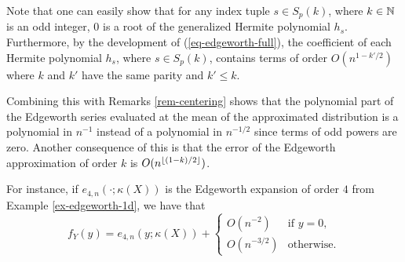 \begin{remark} \label{rem-edge-mean}
    Note that one can easily show that for any index tuple $s \in S_p(k)$, where $k \in \mathbb{N}$ is an odd integer, 0 is a root of the generalized Hermite polynomial $h_s$. 
    Furthermore, by the development of (\ref{eq-edgeworth-full}), the coefficient of each Hermite polynomial $h_s$, where $s \in S_p(k)$, contains terms of order $O(n^{1-k'/2})$ where $k$ and $k'$ have the same parity and $k' \leq k$.

    Combining this with Remarks \ref{rem-centering} shows that the polynomial part of the Edgeworth series evaluated at the mean of the approximated distribution is a polynomial in $n^{-1}$ instead of a polynomial in $n^{-1/2}$ since terms of odd powers are zero. Another consequence of this is that the error of the Edgeworth approximation of order $k$ is $O(n^{\lfloor(1-k)/2\rfloor})$. 
    
    For instance, if $e_{4, n}(\cdot; \kappa(X))$ is the Edgeworth expansion of order $4$ from Example \ref{ex-edgeworth-1d}, we have that
    \begin{equation*}
        f_Y(y) = e_{4, n}(y; \kappa(X)) + \begin{cases}
            O(n^{-2}) &\text{if } y = 0,\\
            O(n^{-3/2}) &\text{otherwise}.
        \end{cases} 
    \end{equation*} 
\end{remark}

